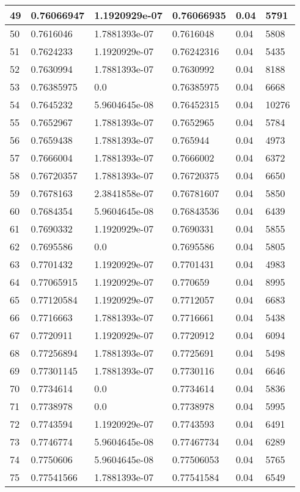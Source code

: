 \begin{longtable}{|l|l|l|l|l|l|}
49 & 0.76066947 & 1.1920929e-07 & 0.76066935 & 0.04 & 5791 \\ \hline 
50 & 0.7616046 & 1.7881393e-07 & 0.7616048 & 0.04 & 5808 \\ \hline 
51 & 0.7624233 & 1.1920929e-07 & 0.76242316 & 0.04 & 5435 \\ \hline 
52 & 0.7630994 & 1.7881393e-07 & 0.7630992 & 0.04 & 8188 \\ \hline 
53 & 0.76385975 & 0.0 & 0.76385975 & 0.04 & 6668 \\ \hline 
54 & 0.7645232 & 5.9604645e-08 & 0.76452315 & 0.04 & 10276 \\ \hline 
55 & 0.7652967 & 1.7881393e-07 & 0.7652965 & 0.04 & 5784 \\ \hline 
56 & 0.7659438 & 1.7881393e-07 & 0.765944 & 0.04 & 4973 \\ \hline 
57 & 0.7666004 & 1.7881393e-07 & 0.7666002 & 0.04 & 6372 \\ \hline 
58 & 0.76720357 & 1.7881393e-07 & 0.76720375 & 0.04 & 6650 \\ \hline 
59 & 0.7678163 & 2.3841858e-07 & 0.76781607 & 0.04 & 5850 \\ \hline 
60 & 0.7684354 & 5.9604645e-08 & 0.76843536 & 0.04 & 6439 \\ \hline 
61 & 0.7690332 & 1.1920929e-07 & 0.7690331 & 0.04 & 5855 \\ \hline 
62 & 0.7695586 & 0.0 & 0.7695586 & 0.04 & 5805 \\ \hline 
63 & 0.7701432 & 1.1920929e-07 & 0.7701431 & 0.04 & 4983 \\ \hline 
64 & 0.77065915 & 1.1920929e-07 & 0.770659 & 0.04 & 8995 \\ \hline 
65 & 0.77120584 & 1.1920929e-07 & 0.7712057 & 0.04 & 6683 \\ \hline 
66 & 0.7716663 & 1.7881393e-07 & 0.7716661 & 0.04 & 5438 \\ \hline 
67 & 0.7720911 & 1.1920929e-07 & 0.7720912 & 0.04 & 6094 \\ \hline 
68 & 0.77256894 & 1.7881393e-07 & 0.7725691 & 0.04 & 5498 \\ \hline 
69 & 0.77301145 & 1.7881393e-07 & 0.7730116 & 0.04 & 6646 \\ \hline 
70 & 0.7734614 & 0.0 & 0.7734614 & 0.04 & 5836 \\ \hline 
71 & 0.7738978 & 0.0 & 0.7738978 & 0.04 & 5995 \\ \hline 
72 & 0.7743594 & 1.1920929e-07 & 0.7743593 & 0.04 & 6491 \\ \hline 
73 & 0.7746774 & 5.9604645e-08 & 0.77467734 & 0.04 & 6289 \\ \hline 
74 & 0.7750606 & 5.9604645e-08 & 0.77506053 & 0.04 & 5765 \\ \hline 
75 & 0.77541566 & 1.7881393e-07 & 0.77541584 & 0.04 & 6549 \\ \hline 
\end{longtable}